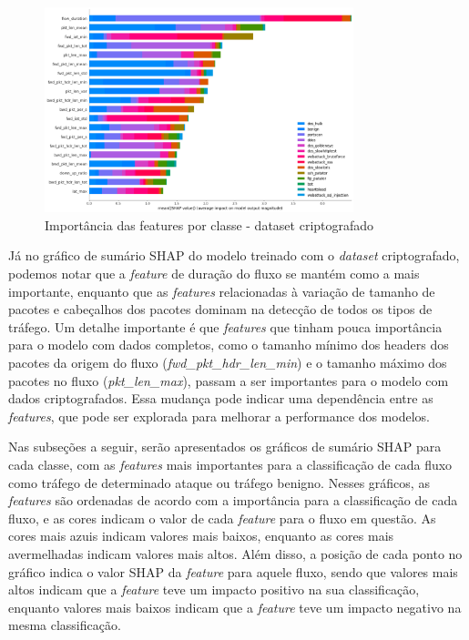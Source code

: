 \documentclass[12pt]{article}
\begin{document}
\begin{figure}[h!]
    \centering
    \includegraphics[width=0.8\textwidth]{figures/feature_importance_criptografado.png}
    \caption{Importância das features por classe - dataset criptografado}
    \label{fig:features_criptografado}
\end{figure}

Já no gráfico de sumário SHAP do modelo treinado com o \emph{dataset} criptografado, podemos notar que a \emph{feature} de duração do fluxo se mantém como a mais importante, enquanto que as \emph{features} relacionadas à variação de tamanho de pacotes e cabeçalhos dos pacotes dominam na detecção de todos os tipos de tráfego. Um detalhe importante é que \emph{features} que tinham pouca importância para o modelo com dados completos, como o tamanho mínimo dos headers dos pacotes da origem do fluxo (\textit{fwd\_pkt\_hdr\_len\_min}) e o tamanho máximo dos pacotes no fluxo (\textit{pkt\_len\_max}), passam a ser importantes para o modelo com dados criptografados. Essa mudança pode indicar uma dependência entre as \emph{features}, que pode ser explorada para melhorar a performance dos modelos.

Nas subseções a seguir, serão apresentados os gráficos de sumário SHAP para cada classe, com as \emph{features} mais importantes para a classificação de cada fluxo como tráfego de determinado ataque ou tráfego benigno. Nesses gráficos, as \emph{features} são ordenadas de acordo com a importância para a classificação de cada fluxo, e as cores indicam o valor de cada \emph{feature} para o fluxo em questão. As cores mais azuis indicam valores mais baixos, enquanto as cores mais avermelhadas indicam valores mais altos. Além disso, a posição de cada ponto no gráfico indica o valor SHAP da \emph{feature} para aquele fluxo, sendo que valores mais altos indicam que a \emph{feature} teve um impacto positivo na sua classificação, enquanto valores mais baixos indicam que a \emph{feature} teve um impacto negativo na mesma classificação.
\end{document}
